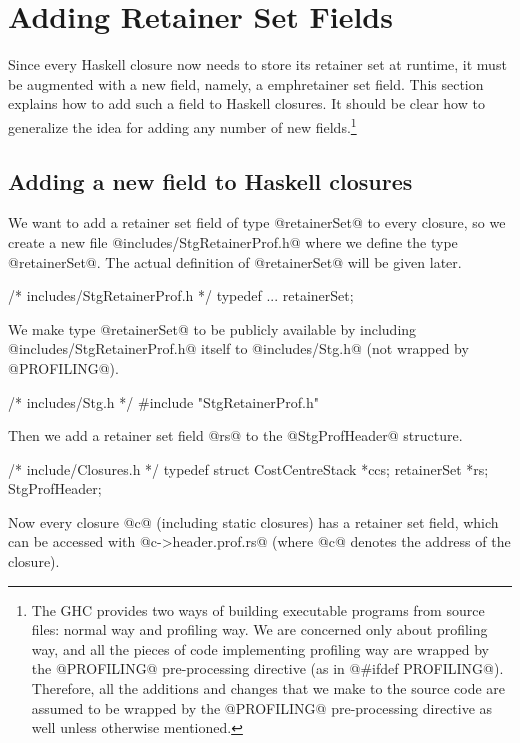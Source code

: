 \documentclass{article}
\begin{document}
\section{Adding Retainer Set Fields}

Since every Haskell closure now needs to store its retainer set at runtime, 
it must be augmented with a new field,
namely, a emph{retainer set field}.
This section explains how to add such a field to Haskell closures.
It should be clear how to generalize the idea for adding 
any number of new fields.\footnote{The GHC provides two 
ways of building executable programs from 
source files: normal way and profiling way. 
We are concerned only about profiling way, and all the pieces of code 
implementing profiling way are wrapped by the @PROFILING@ 
pre-processing directive (as in @\#ifdef PROFILING@).
Therefore, all the additions and changes that we make to the source code 
are assumed to be wrapped by the @PROFILING@ pre-processing 
directive as well unless otherwise mentioned.}

\subsection{Adding a new field to Haskell closures} 

We want to add a retainer set field of type @retainerSet@ to every 
closure, so we create a new file @includes/StgRetainerProf.h@ where
we define the type @retainerSet@.
The actual definition of @retainerSet@ will be given later.

\begin{code}
/* includes/StgRetainerProf.h */
typedef ... retainerSet;
\end{code}

We make type @retainerSet@ to be publicly available by including
@includes/StgRetainerProf.h@ itself to @includes/Stg.h@ (not wrapped
by @PROFILING@).

\begin{code}
/* includes/Stg.h */
#include "StgRetainerProf.h"
\end{code}

Then we add a retainer set field @rs@ to the @StgProfHeader@ structure.

\begin{code}
/* include/Closures.h */
typedef struct {
   CostCentreStack *ccs;
   retainerSet *rs;
} StgProfHeader;
\end{code}

Now every closure @c@ (including static closures) has a retainer set field,
which can be accessed with @c->header.prof.rs@ (where @c@ denotes the 
address of the closure).
\end{document}
